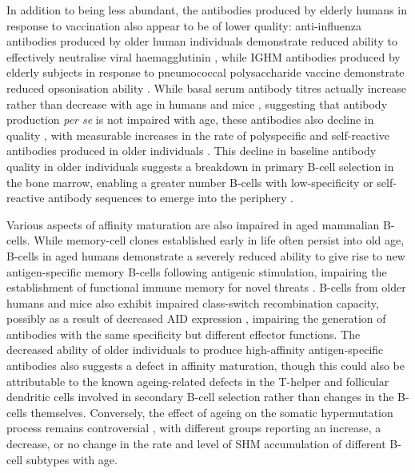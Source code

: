 In addition to being less abundant, the antibodies produced by elderly humans in response to vaccination also appear to be of lower quality: anti-influenza antibodies produced by older human individuals demonstrate reduced ability to effectively neutralise viral haemagglutinin \parencite{kogut2012bcells,sasaki2011limited}, while IGHM antibodies produced by elderly subjects in response to pneumococcal polysaccharide vaccine demonstrate reduced opsonisation ability \parencite{kogut2012bcells}. While basal serum antibody titres actually increase rather than decrease with age in humans and mice \parencite{frasca2009ageing}, suggesting that antibody production \textit{per se} is not impaired with age, these antibodies also decline in quality \parencite{montecino2013immunosenescence}, with measurable increases in the rate of polyspecific and self-reactive antibodies produced in older individuals \parencite{kogut2012bcells}. This decline in baseline antibody quality in older individuals suggests a breakdown in primary B-cell selection in the bone marrow, enabling a greater number B-cells with low-specificity or self-reactive antibody sequences to emerge into the periphery \parencite{ademokun2010ageing}.

Various aspects of affinity maturation are also impaired in aged mammalian B-cells. While memory-cell clones established early in life often persist into old age, \naive B-cells in aged humans demonstrate a severely reduced ability to give rise to new antigen-specific memory B-cells following antigenic stimulation, impairing the establishment of functional immune memory for novel threats \parencite{aberle2013mechanistic}. B-cells from older humans and mice also exhibit impaired class-switch recombination capacity, possibly as a result of decreased AID expression \parencite{montecino2013immunosenescence,blomberg2013age,frasca2011age}, impairing the generation of antibodies with the same specificity but different effector functions. The decreased ability of older individuals to produce high-affinity antigen-specific antibodies \parencite{frasca2011age} also suggests a defect in affinity maturation, though this could also be attributable to the known ageing-related defects in the T-helper and follicular dendritic cells involved in secondary B-cell selection \parencite{montecino2013immunosenescence,aberle2013mechanistic,ademokun2010ageing} rather than changes in the B-cells themselves. Conversely, the effect of ageing on the somatic hypermutation process remains controversial \parencite{henry2019influenza,howard2006quality,ademokun2010ageing,frasca2009ageing}, with different groups reporting an increase, a decrease, or no change in the rate and level of SHM accumulation of different B-cell subtypes with age. 

